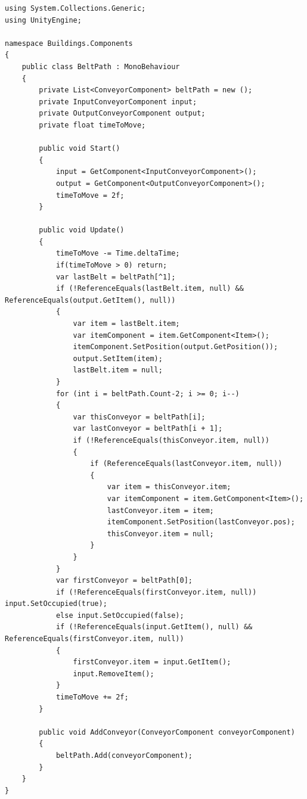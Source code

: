 \documentclass[12pt, titlepage]{article}
\begin{document}
\begin{lstlisting}[style=code, caption={Förderband Komponente OOP}]
using System.Collections.Generic;
using UnityEngine;

namespace Buildings.Components
{
    public class BeltPath : MonoBehaviour
    {
        private List<ConveyorComponent> beltPath = new ();
        private InputConveyorComponent input;
        private OutputConveyorComponent output;
        private float timeToMove;

        public void Start()
        {
            input = GetComponent<InputConveyorComponent>();
            output = GetComponent<OutputConveyorComponent>();
            timeToMove = 2f;
        }

        public void Update()
        {
            timeToMove -= Time.deltaTime;
            if(timeToMove > 0) return;
            var lastBelt = beltPath[^1];
            if (!ReferenceEquals(lastBelt.item, null) && ReferenceEquals(output.GetItem(), null))
            {
                var item = lastBelt.item;
                var itemComponent = item.GetComponent<Item>();
                itemComponent.SetPosition(output.GetPosition());
                output.SetItem(item);
                lastBelt.item = null;
            }
            for (int i = beltPath.Count-2; i >= 0; i--)
            {
                var thisConveyor = beltPath[i];
                var lastConveyor = beltPath[i + 1];
                if (!ReferenceEquals(thisConveyor.item, null))
                {
                    if (ReferenceEquals(lastConveyor.item, null))
                    {
                        var item = thisConveyor.item;
                        var itemComponent = item.GetComponent<Item>();
                        lastConveyor.item = item;
                        itemComponent.SetPosition(lastConveyor.pos);
                        thisConveyor.item = null;
                    }
                }
            }
            var firstConveyor = beltPath[0];
            if (!ReferenceEquals(firstConveyor.item, null)) input.SetOccupied(true);
            else input.SetOccupied(false);
            if (!ReferenceEquals(input.GetItem(), null) && ReferenceEquals(firstConveyor.item, null))
            {
                firstConveyor.item = input.GetItem();
                input.RemoveItem();
            }
            timeToMove += 2f;
        }

        public void AddConveyor(ConveyorComponent conveyorComponent)
        {
            beltPath.Add(conveyorComponent);
        }
    }
}
\end{lstlisting}
\end{document}
